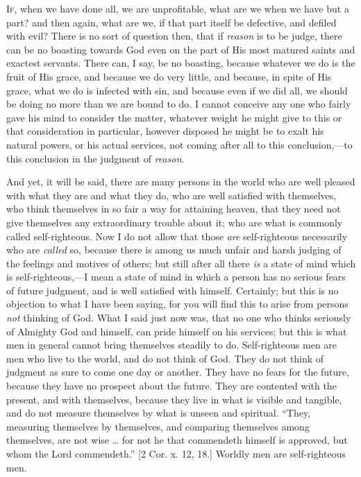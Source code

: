 I\textsc{f}, when we have done all, we are unprofitable, what are we when we
have but a part? and then again, what are we, if that part itself be
defective, and defiled with evil? There is no sort of question then,
that if \emph{reason} is to be judge, there can be no boasting towards
God even on the part of His most matured saints and exactest servants.
There can, I say, be no boasting, because whatever we do is the fruit
of His grace, and because we do very little, and because, in spite of
His grace, what we do is infected with sin, and because even if we did
all, we should be doing no more than we are bound to do. I cannot
conceive any one who fairly gave his mind to consider the matter,
whatever weight he might give to this or that consideration in
particular, however disposed he might be to exalt his natural powers,
or his actual services, not coming after all to this conclusion,—to
this conclusion in the judgment of \emph{reason}.

And yet, it will be said, there are many persons in the world who
are well pleased with what they are and what they do, who are well
satisfied with themselves, who think themselves in so fair a way for
attaining heaven, that they need not give themselves any extraordinary
trouble about it; who are what is commonly called self-righteous. Now
I do not allow that those \emph{are} self-righteous necessarily who
are \emph{called} so, because there is among us much unfair and harsh
judging of the feelings and motives of others; but still after all
there \emph{is} a state of mind which is self-righteous,—I mean a
state of mind in which a person has no serious fears of future
judgment, and is well satisfied with himself. Certainly; but this is
no objection to what I have been saying, for you will find this to
arise from persons \emph{not} thinking of God. What I said just now
was, that no one who thinks seriously of Almighty God and himself, can
pride himself on his services; but this is what men in general cannot
bring themselves steadily to do. Self-righteous men are men who live
to the world, and do not think of God. They do not think of judgment
as sure to come one day or another. They have no fears for the future,
because they have no prospect about the future. They are contented
with the present, and with themselves, because they live in what is
visible and tangible, and do not measure themselves by what is unseen
and spiritual. ``They, measuring themselves by themselves, and
comparing themselves among themselves, are not wise … for not he
that commendeth himself is approved, but whom the Lord commendeth.''
[2 Cor. x. 12, 18.] Worldly men are self-righteous men.

